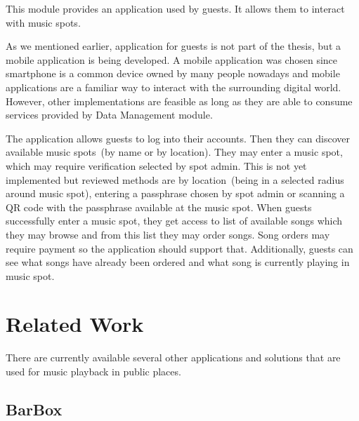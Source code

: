 This module provides an application used by guests. It allows them to interact with music spots.
\par
As we mentioned earlier, application for guests is not part of the thesis, but a mobile application is being developed. A mobile application was chosen since smartphone is a common device owned by many people nowadays and mobile applications are a familiar way to interact with the surrounding digital world. However, other implementations are feasible as long as they are able to consume services provided by Data Management module.
\par
The application allows guests to log into their accounts. Then they can discover available music spots~(by name or by location). They may enter a music spot, which may require verification selected by spot admin. This is not yet implemented but reviewed methods are by location~(being in a selected radius around music spot), entering a passphrase chosen by spot admin or scanning a QR code with the passphrase available at the music spot. When guests successfully enter a music spot, they get access to list of available songs which they may browse and from this list they may order songs. Song orders may require payment so the application should support that. Additionally, guests can see what songs have already been ordered and what song is currently playing in music spot.

\section{Related Work}

There are currently available several other applications and solutions that are used for music playback in public places.

\subsection{BarBox}

